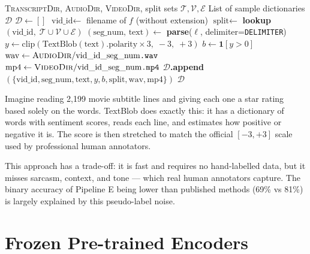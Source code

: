 \documentclass[12pt,a4paper]{article}
\theoremstyle{definition}
\begin{document}
\begin{algorithm}[H]
\caption{\textsc{BuildSamples} — Construct CMU-MOSI Sample List}
\label{alg:build_samples}
\begin{algorithmic}[1]
\Require \textsc{TranscriptDir}, \textsc{AudioDir}, \textsc{VideoDir}, split sets $\mathcal{T}, \mathcal{V}, \mathcal{E}$
\Ensure List of sample dictionaries $\mathcal{D}$
\State $\mathcal{D} \gets []$
  \State $\text{vid\_id} \gets$ filename of $f$ (without extension)
  \State $\text{split} \gets$ \textbf{lookup}$(\text{vid\_id},\; \mathcal{T} \cup \mathcal{V} \cup \mathcal{E})$
    \State $(\text{seg\_num},\, \text{text}) \gets$ \textbf{parse}($\ell$, delimiter=\texttt{DELIMITER})
    \State $y \gets \text{clip}(\text{TextBlob}(\text{text}).\text{polarity} \times 3,\; -3,\; +3)$
    \State $b \gets \mathbf{1}[y > 0]$
    \State $\text{wav} \gets \textsc{AudioDir} / \text{vid\_id}\_\text{seg\_num}\texttt{.wav}$
    \State $\text{mp4} \gets \textsc{VideoDir} / \text{vid\_id}\_\text{seg\_num}\texttt{.mp4}$
    \State $\mathcal{D}$\textbf{.append}$\!\left(\{\text{vid\_id}, \text{seg\_num}, \text{text}, y, b, \text{split}, \text{wav}, \text{mp4}\}\right)$
  \EndFor
\EndFor
\State \Return $\mathcal{D}$
\end{algorithmic}
\end{algorithm}

\begin{laymanbox}
Imagine reading 2,199 movie subtitle lines and giving each one a star rating based solely on the words. TextBlob does exactly this: it has a dictionary of words with sentiment scores, reads each line, and estimates how positive or negative it is. The score is then stretched to match the official $[-3, +3]$ scale used by professional human annotators.

This approach has a trade-off: it is fast and requires no hand-labelled data, but it misses sarcasm, context, and tone — which real human annotators capture. The binary accuracy of Pipeline E being lower than published methods (69\% vs 81\%) is largely explained by this pseudo-label noise.
\end{laymanbox}

\section{Frozen Pre-trained Encoders}
\end{document}
